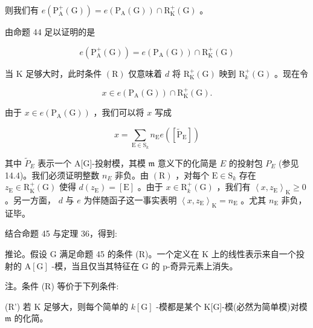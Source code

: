 \documentclass[10pt]{article}
\begin{document}
则我们有 \(e\left( {{\mathrm{P}}_{\mathrm{A}}^{ + }\left( \mathrm{G}\right) }\right)  = e\left( {{\mathrm{P}}_{\mathrm{A}}\left( \mathrm{G}\right) }\right)  \cap  {\mathrm{R}}_{\mathrm{K}}^{ + }\left( \mathrm{G}\right)\) 。

由命题 44 足以证明的是

\[
e\left( {{\mathrm{P}}_{\mathrm{A}}^{ + }\left( \mathrm{G}\right) }\right)  = e\left( {{\mathrm{P}}_{\mathrm{A}}\left( \mathrm{G}\right) }\right)  \cap  {\mathrm{R}}_{\mathrm{K}}^{ + }\left( \mathrm{G}\right)
\]

当 \(\mathrm{K}\) 足够大时，此时条件 \(\left( \mathrm{R}\right)\) 仅意味着 \(d\) 将 \({\mathrm{R}}_{\mathrm{K}}^{ + }\left( \mathrm{G}\right)\) 映到 \({\mathrm{R}}_{k}^{ + }\left( \mathrm{G}\right)\) 。现在令

\[
x \in  e\left( {{\mathrm{P}}_{\mathrm{A}}\left( \mathrm{G}\right) }\right)  \cap  {\mathrm{R}}_{\mathrm{K}}^{ + }\left( \mathrm{G}\right) .
\]

由于 \(x \in  e\left( {{\mathrm{P}}_{\mathrm{A}}\left( \mathrm{G}\right) }\right)\) ，我们可以将 \(x\) 写成

\[
x = \mathop{\sum }\limits_{{\mathrm{E} \in  {\mathrm{S}}_{k}}}{n}_{\mathrm{E}}e\left( \left\lbrack  {\widetilde{\mathrm{P}}}_{\mathrm{E}}\right\rbrack  \right)
\]

其中 \({\widetilde{P}}_{E}\) 表示一个 A[G]-投射模，其模 \(\mathfrak{m}\) 意义下的化简是 \(E\) 的投射包 \({P}_{E}\) (参见 14.4)。我们必须证明整数 \({n}_{E}\) 非负。由 \(\left( \mathrm{R}\right)\) ，对每个 \(\mathrm{E} \in  {\mathrm{S}}_{k}\) 存在 \({z}_{\mathrm{E}} \in  {\mathrm{R}}_{\mathrm{K}}^{ + }\left( \mathrm{G}\right)\) 使得 \(d\left( {z}_{\mathrm{E}}\right)  = \left\lbrack  \mathrm{E}\right\rbrack\) 。由于 \(x \in  {\mathrm{R}}_{k}^{ + }\left( \mathrm{G}\right)\) ，我们有 \({\left\langle  x,{z}_{\mathrm{E}}\right\rangle  }_{\mathrm{K}} \geq  0\) 。另一方面， \(d\) 与 \(e\) 为伴随函子这一事实表明 \({\left\langle  x,{z}_{\mathrm{E}}\right\rangle  }_{\mathrm{K}} = {n}_{\mathrm{E}}\) 。尤其 \({n}_{\mathrm{E}}\) 非负，证毕。

结合命题 45 与定理 36，得到:

推论。假设 G 满足命题 45 的条件 (R)。一个定义在 \(\mathrm{K}\) 上的线性表示来自一个投射的 \(\mathrm{A}\left\lbrack  \mathrm{G}\right\rbrack\) -模，当且仅当其特征在 \(\mathrm{G}\) 的 p-奇异元素上消失。

注。条件 (R) 等价于下列条件:

(R’) 若 \(\mathrm{K}\) 足够大，则每个简单的 \(k\left\lbrack  \mathrm{G}\right\rbrack\) -模都是某个 K[G]-模(必然为简单模)对模 \(\mathfrak{m}\) 的化简。
\end{document}
